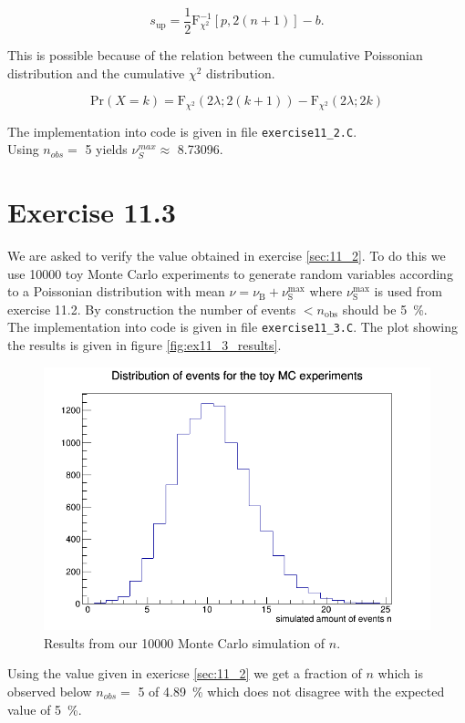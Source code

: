 \documentclass[10pt]{article}
\newenvironment{myfont}{\fontfamily{put}\selectfont}{\par}
\begin{document}
\begin{myfont}
\begin{equation}
	s_{\textrm{up}} = \frac{1}{2} \textrm{F}_{\chi^{2}}^{-1}\left[p, 2(n+1)\right] - b.
\end{equation}

\noindent This is possible because of the relation between the cumulative Poissonian distribution and the cumulative $\chi^{2}$ distribution.

\begin{equation}
	\textrm{Pr}(X = k) = \textrm{F}_{\chi^{2}}(2\lambda; 2(k+1)) - \textrm{F}_{\chi^{2}}(2\lambda; 2k)
\end{equation}

\noindent The implementation into code is given in file \texttt{exercise11\_2.C}. \\
Using $n_{obs} =$ \num{5} yields $\nu_{S}^{max} \approx$ \num{8.73096}.


\section*{Exercise 11.3}

We are asked to verify the value obtained in exercise \ref{sec:11_2}.
To do this we use \num{10000} toy Monte Carlo experiments to generate random variables according to a Poissonian distribution with mean $\nu = \nu_{\textrm{B}} + \nu_{\textrm{S}}^{\textrm{max}}$ where $\nu_{\textrm{S}}^{\textrm{max}}$ is used from exercise 11.2.
By construction the number of events $< n_{\textrm{obs}}$ should be \SI{5}{\percent}. \\
The implementation into code is given in file \texttt{exercise11\_3.C}.
The plot showing the results is given in figure \ref{fig:ex11_3_results}.

\begin{figure}
	\centering
	\includegraphics[width = 0.6 \textwidth]{./exercise11_3.png}
	\caption{Results from our \num{10000} Monte Carlo simulation of $n$.}
\end{figure}

\noindent Using the value given in exericse \ref{sec:11_2} we get a fraction of $n$ which is observed below $n_{obs} =$ \num{5} of \SI{4.89}{\percent} which does not disagree with the expected value of \SI{5}{\percent}.

\end{myfont}
\end{document}
